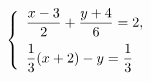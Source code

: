 \begin{ex}
	\begin{condition}
		\( \left\{
		\begin{array}{l}
			\dfrac{x-3}{2}+\dfrac{y+4}{6}=2,\vspace{0,2cm}\\
			\dfrac{1}{3}(x+2)-y=\dfrac{1}{3}
		\end{array}
		\right. \)
	\end{condition}
\end{ex}
